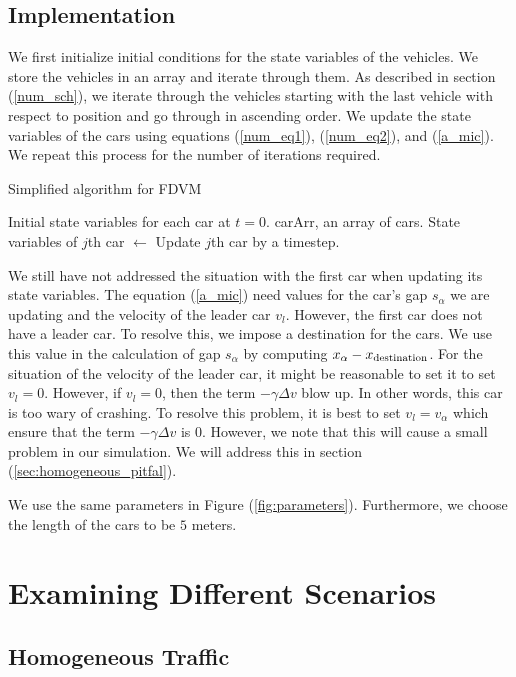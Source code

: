 \documentclass[12pt]{article}
\begin{document}
    \subsection{Implementation}\label{sec:implementation}
    We first initialize initial conditions for the state variables of the vehicles. We store the vehicles in an array and iterate through them. As described in section (\ref{num_sch}), we iterate through the vehicles starting with the last vehicle with respect to position and go through in ascending order. We update the state variables of the cars using equations (\ref{num_eq1}), (\ref{num_eq2}), and (\ref{a_mic}). We repeat this process for the number of iterations required. 
    \begin{algorithm}
      \caption{Simplified algorithm for FDVM}\label{alg:car-following}
      \begin{algorithmic}
      \Require Initial state variables for each car at $t=0$. 
      \Require carArr, an array of cars.
        \State State variables of $j$th car $\gets$ Update $j$th car by a timestep.
        \EndFor
      \EndFor
      \end{algorithmic}
      \end{algorithm}
    We still have not addressed the situation with the first car when updating its state variables. The equation (\ref{a_mic}) need values for the car's gap $s_\alpha$ we are updating and the velocity of the leader car $v_l$. However, the first car does not have a leader car. To resolve this, we impose a destination for the cars. We use this value in the calculation of gap $s_\alpha$ by computing $x_\alpha - x_{\rm destination}$. For the situation of the velocity of the leader car, it might be reasonable to set it to set $v_l = 0$. However, if $v_l=0$, then the term $-\gamma \Delta v$ blow up. In other words, this car is too wary of crashing. To resolve this problem, it is best to set $v_l = v_\alpha$ which ensure that the term $-\gamma \Delta v$ is $0$. However, we note that this will cause a small problem in our simulation. We will address this in section (\ref{sec:homogeneous_pitfal}). 
    
    We use the same parameters in Figure (\ref{fig:parameters}). Furthermore, we choose the length of the cars to be $5$ meters.
    \section{Examining Different Scenarios}
    \subsection{Homogeneous Traffic}\label{sec:homogeneous}
\end{document}

